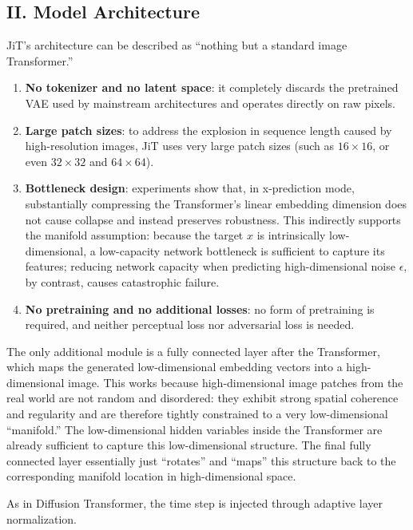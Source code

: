 \hypertarget{ii.-model-architecture-1}{%
\subsection{II. Model Architecture}\label{ii.-model-architecture-1}}

JiT's architecture can be described as ``nothing but a standard image Transformer.''

\begin{enumerate}
\def\labelenumi{\arabic{enumi}.}
\tightlist
\item
  \textbf{No tokenizer and no latent space}: it completely discards the pretrained VAE used by mainstream architectures and operates directly on raw pixels.
\item
  \textbf{Large patch sizes}: to address the explosion in sequence length caused by high-resolution images, JiT uses very large patch sizes (such as \(16\times16\), or even \(32\times32\) and \(64\times64\)).
\item
  \textbf{Bottleneck design}: experiments show that, in x-prediction mode, substantially compressing the Transformer's linear embedding dimension does not cause collapse and instead preserves robustness. This indirectly supports the manifold assumption: because the target \(x\) is intrinsically low-dimensional, a low-capacity network bottleneck is sufficient to capture its features; reducing network capacity when predicting high-dimensional noise \(\epsilon\), by contrast, causes catastrophic failure.
\item
  \textbf{No pretraining and no additional losses}: no form of pretraining is required, and neither perceptual loss nor adversarial loss is needed.
\end{enumerate}

The only additional module is a fully connected layer after the Transformer, which maps the generated low-dimensional embedding vectors into a high-dimensional image. This works because high-dimensional image patches from the real world are not random and disordered: they exhibit strong spatial coherence and regularity and are therefore tightly constrained to a very low-dimensional ``manifold.'' The low-dimensional hidden variables inside the Transformer are already sufficient to capture this low-dimensional structure. The final fully connected layer essentially just ``rotates'' and ``maps'' this structure back to the corresponding manifold location in high-dimensional space.

As in Diffusion Transformer, the time step is injected through adaptive layer normalization.


